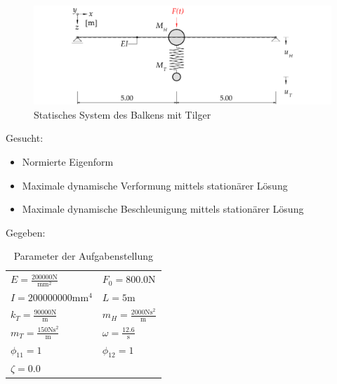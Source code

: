 \documentclass[
  letterpaper,
  DIV=11]{scrreprt}
\providecommand{\tightlist}{%
  \setlength{\itemsep}{0pt}\setlength{\parskip}{0pt}}\usepackage{longtable,booktabs,array}
\begin{document}
\begin{figure}[H]

{\centering \includegraphics{index_files/mediabag/bilder/aufgabe_mms_tilg_system.pdf}

}

\caption{\label{fig-mms_tilg_tilger}Statisches System des Balkens mit
Tilger}

\end{figure}

Gesucht:

\begin{itemize}
\tightlist
\item
  Normierte Eigenform
\item
  Maximale dynamische Verformung mittels stationärer Lösung
\item
  Maximale dynamische Beschleunigung mittels stationärer Lösung
\end{itemize}

Gegeben:

\hypertarget{tbl-parameter_mms4}{}
\begin{longtable}[]{@{}
  >{\raggedright\arraybackslash}p{}
  >{\raggedright\arraybackslash}p{}@{}}
\caption{\label{tbl-parameter_mms4}Parameter der
Aufgabenstellung}\tabularnewline
\toprule\noalign{}
\endfirsthead
\endhead
\bottomrule\noalign{}
\endlastfoot
\(E = \frac{200000 \text{N}}{\text{mm}^{2}}\) &
\(F_{0} = 800.0 \text{N}\) \\
\(I = 200000000 \text{mm}^{4}\) & \(L = 5 \text{m}\) \\
\(k_{T} = \frac{90000 \text{N}}{\text{m}}\) &
\(m_{H} = \frac{2000 \text{N} \text{s}^{2}}{\text{m}}\) \\
\(m_{T} = \frac{150 \text{N} \text{s}^{2}}{\text{m}}\) &
\(\omega = \frac{12.6}{\text{s}}\) \\
\(\phi_{11} = 1\) & \(\phi_{12} = 1\) \\
\(\zeta = 0.0\) & \\
\end{longtable}
\end{document}
